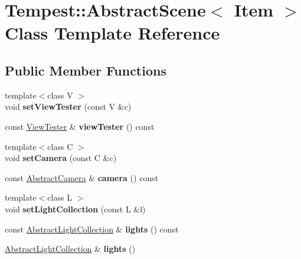 \hypertarget{class_tempest_1_1_abstract_scene}{\section{Tempest\+:\+:Abstract\+Scene$<$ Item $>$ Class Template Reference}
\label{class_tempest_1_1_abstract_scene}
}
\subsection*{Public Member Functions}
\begin{DoxyCompactItemize}
\item 
\hypertarget{class_tempest_1_1_abstract_scene_aca4d534e1e081093f50dfc0e7474dc67}{{\footnotesize template$<$class V $>$ }\\void {\bfseries set\+View\+Tester} (const V \&c)}\label{class_tempest_1_1_abstract_scene_aca4d534e1e081093f50dfc0e7474dc67}

\item 
\hypertarget{class_tempest_1_1_abstract_scene_a834440cb1ae408c16c42c4099534cc51}{const \hyperlink{class_tempest_1_1_view_tester}{View\+Tester} \& {\bfseries view\+Tester} () const }\label{class_tempest_1_1_abstract_scene_a834440cb1ae408c16c42c4099534cc51}

\item 
\hypertarget{class_tempest_1_1_abstract_scene_ac7c5496c586b0b4f611e9a554a436410}{{\footnotesize template$<$class C $>$ }\\void {\bfseries set\+Camera} (const C \&c)}\label{class_tempest_1_1_abstract_scene_ac7c5496c586b0b4f611e9a554a436410}

\item 
\hypertarget{class_tempest_1_1_abstract_scene_a431c2b26d9ec11097a2b523784908db8}{const \hyperlink{class_tempest_1_1_abstract_camera}{Abstract\+Camera} \& {\bfseries camera} () const }\label{class_tempest_1_1_abstract_scene_a431c2b26d9ec11097a2b523784908db8}

\item 
\hypertarget{class_tempest_1_1_abstract_scene_a46a27924de77f46a44506472ce372426}{{\footnotesize template$<$class L $>$ }\\void {\bfseries set\+Light\+Collection} (const L \&l)}\label{class_tempest_1_1_abstract_scene_a46a27924de77f46a44506472ce372426}

\item 
\hypertarget{class_tempest_1_1_abstract_scene_a5d7c32ca63959fa02cf2ef806725c2e8}{const \hyperlink{class_tempest_1_1_abstract_light_collection}{Abstract\+Light\+Collection} \& {\bfseries lights} () const }\label{class_tempest_1_1_abstract_scene_a5d7c32ca63959fa02cf2ef806725c2e8}

\item 
\hypertarget{class_tempest_1_1_abstract_scene_adaf166ff86831c58adccf2d2cdb53da2}{\hyperlink{class_tempest_1_1_abstract_light_collection}{Abstract\+Light\+Collection} \& {\bfseries lights} ()}\label{class_tempest_1_1_abstract_scene_adaf166ff86831c58adccf2d2cdb53da2}

\end{DoxyCompactItemize}
